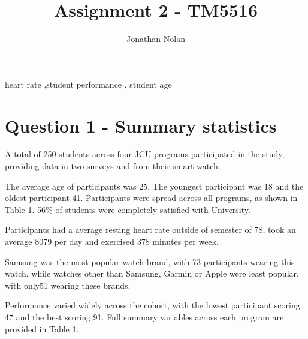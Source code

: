 \documentclass[preprint, 3p,
authoryear]{elsarticle} %
\begin{document}
\begin{frontmatter}

  \title{Assignment 2 - TM5516}
    \author[James Cook University]{Jonathan Nolan%
  }
  
  \begin{abstract}
  
  \end{abstract}
    \begin{keyword}
    heart rate \sep student performance \sep 
    student age
  \end{keyword}
  
 \end{frontmatter}

\hypertarget{question-1---summary-statistics}{%
\section{Question 1 - Summary
statistics}\label{question-1---summary-statistics}}

A total of 250 students across four JCU programs participated in the
study, providing data in two surveys and from their smart watch.

The average age of participants was 25. The youngest participant was 18
and the oldest participant 41. Participants were spread across all
programs, as shown in Table 1. 56\% of students were completely
satisfied with University.

Participants had a average resting heart rate outside of semester of 78,
took an average 8079 per day and exercised 378 minutes per week.

Samsung was the most popular watch brand, with 73 participants wearing
this watch, while watches other than Samsung, Garmin or Apple were least
popular, with only51 wearing these brands.

Performance varied widely across the cohort, with the lowest participant
scoring 47 and the best scoring 91. Full summary variables across each
program are provided in Table 1.
\end{document}
